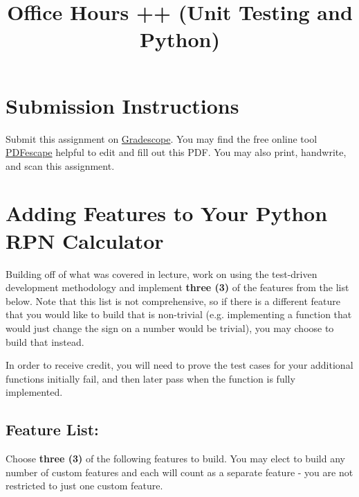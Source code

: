 \documentclass{article}
\begin{document}
\fancyfoot[C]{\color{gray} \thepage~/~\pageref*{LastPage}}
\pagestyle{fancyplain}

\title{\textbf{Office Hours ++ (Unit Testing and Python)\\}}
\author{\textbf{\color{red}{Due: Saturday, February 24th, 11:59PM (Hard Deadline)}}}
\date{}
\maketitle


\section*{Submission Instructions}
Submit this assignment on \href{https://gradescope.com/courses/13649}{Gradescope}.
You may find the free online tool \href{https://www.pdfescape.com}{PDFescape}
helpful to edit and fill out this PDF.
You may also print, handwrite, and scan this assignment.

\section*{Adding Features to Your Python RPN Calculator}

Building off of what was covered in lecture, work on using the test-driven development methodology and implement \textbf{three (3)} of the features from the list below. Note that this list is not comprehensive, so if there is a different feature that you would like to build that is non-trivial (e.g. implementing a function that would just change the sign on a number would be trivial), you may choose to build that instead.

In order to receive credit, you will need to prove the test cases for your additional functions initially fail, and then later pass when the function is fully implemented.

\subsection*{Feature List:}
Choose \textbf{three (3)} of the following features to build. You may elect to build any number of custom features and each will count as a separate feature - you are not restricted to just one custom feature.
\end{document}

